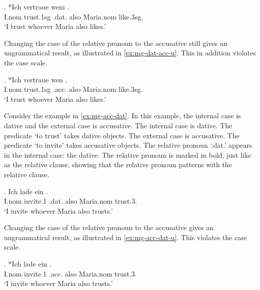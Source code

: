 \exg. *Ich vertraue wem   . \\
I.\ac{nom} trust.1\ac{sg}\scsub{[dat]} .\ac{dat}. also Maria.\ac{nom} like.3\ac{sg}\scsub{[acc]}.\\
`I trust whoever Maria also likes.' \label{ex:mg-dat-acc}

Changing the case of the relative pronoun to the accusative still gives an ungrammatical result, as illustrated in \ref{ex:mg-dat-acc-u}. This in addition violates the case scale.

\exg. *Ich vertraue wen   . \\
I.\ac{nom} trust.1\ac{sg}\scsub{[dat]} .\ac{acc}. also Maria.\ac{nom} like.3\ac{sg}\scsub{[acc]}.\\
`I trust whoever Maria also likes.' \label{ex:mg-dat-acc-u}

Consider the example in \ref{ex:mg-acc-dat}. In this example, the internal case is dative and the external case is accusative.
The internal case is dative. The predicate  `to trust' takes dative objects.
The external case is accusative. The predicate  `to invite' takes accusative objects.
The relative pronoun  `.\ac{dat}.' appears in the internal case: the dative. The relative pronoun is marked in bold, just like as the relative clause, showing that the relative pronoun patterns with the relative clause.

\exg. Ich {lade ein}    . \\
I.\ac{nom} invite.1\scsub{[acc]} .\ac{dat}. also Maria.\ac{nom} trust.3\scsub{[dat]}.\\
`I invite whoever Maria also trusts.' \label{ex:mg-acc-dat}

Changing the case of the relative pronoun to the accusative gives an ungrammatical result, as illustrated in \ref{ex:mg-acc-dat-u}. This violates the case scale.

\exg. *Ich {lade ein}    . \\
I.\ac{nom} invite.1\scsub{[acc]} .\ac{acc}. also Maria.\ac{nom} trust.3\scsub{[dat]}.\\
`I invite whoever Maria also trusts.' \label{ex:mg-acc-dat-u}


